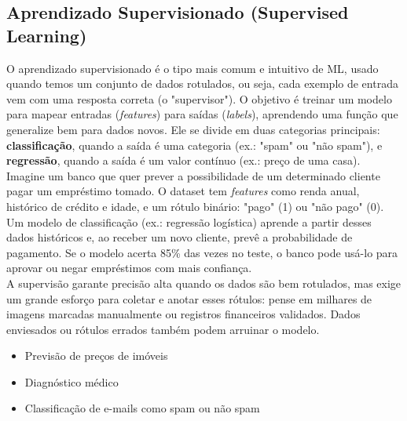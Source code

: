 \documentclass[a4paper,12pt,openany]{book}
\begin{document}
\subsection{Aprendizado Supervisionado (Supervised Learning)}
O aprendizado supervisionado é o tipo mais comum e intuitivo de ML, usado quando temos um conjunto de dados rotulados, ou seja, cada exemplo de entrada vem com uma resposta correta (o "supervisor"). O objetivo é treinar um modelo para mapear entradas (\textit{features}) para saídas (\textit{labels}), aprendendo uma função que generalize bem para dados novos. Ele se divide em duas categorias principais: \textbf{classificação}, quando a saída é uma categoria (ex.: "spam" ou "não spam"), e \textbf{regressão}, quando a saída é um valor contínuo (ex.: preço de uma casa).\\
Imagine um banco que quer prever a possibilidade de um determinado cliente pagar um empréstimo tomado. O dataset tem \textit{features} como renda anual, histórico de crédito e idade, e um rótulo binário: "pago" (1) ou "não pago" (0). Um modelo de classificação (ex.: regressão logística) aprende a partir desses dados históricos e, ao receber um novo cliente, prevê a probabilidade de pagamento. Se o modelo acerta 85\% das vezes no teste, o banco pode usá-lo para aprovar ou negar empréstimos com mais confiança.\\
A supervisão garante precisão alta quando os dados são bem rotulados, mas exige um grande esforço para coletar e anotar esses rótulos: pense em milhares de imagens marcadas manualmente ou registros financeiros validados. Dados enviesados ou rótulos errados também podem arruinar o modelo.
\begin{itemize}
        \item Previsão de preços de imóveis
        \item Diagnóstico médico
        \item Classificação de e-mails como spam ou não spam
\end{itemize}
\end{document}
